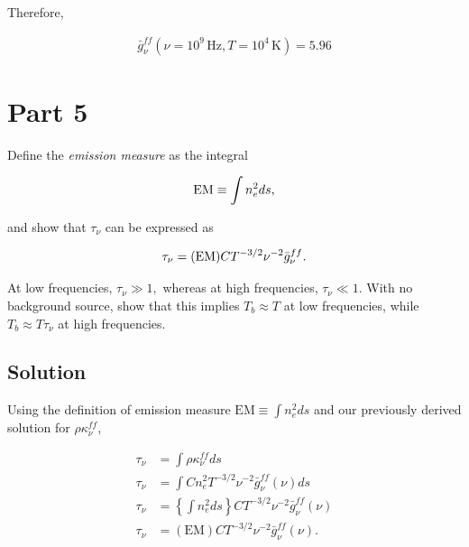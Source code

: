 \documentclass[12pt]{article}
\begin{document}
Therefore,

\begin{align*}
    \boxed{\bar{g}_\nu^{ff}(\nu=10^9\,\mathrm{Hz},T=10^4\,\mathrm{K}) = 5.96}
\end{align*}


\section*{Part 5}

Define the \textit{emission measure} as the integral

\begin{align*}
{\rm EM} \equiv \int n_e^2ds,
\end{align*}

{\noindent}and show that $\tau_\nu$ can be expressed as 

\begin{align} \label{eq:4}
\tau_\nu = ({\rm EM})CT^{-3/2}\nu^{-2}\bar{g}_\nu^{ff}.
\end{align}


{\noindent}At low frequencies, $\tau_\nu \gg 1,$ whereas at high frequencies, $\tau_\nu \ll 1$. With no background source, show that this implies $T_b \approx T$ at low frequencies, while $T_b \approx T\tau_\nu$ at high frequencies.


\subsection*{Solution}

Using the definition of emission measure $\mathrm{EM} \equiv \int n_e^2ds$ and our previously derived solution for $\rho\kappa_\nu^{ff}$,

\begin{equation*}
\begin{split}
    \tau_\nu &= \int \rho\kappa_\nu^{ff}ds \\
    \tau_\nu &= \int C n_e^2 T^{-3/2} \nu^{-2}\bar{g}_\nu^{ff}(\nu) ds \\
    \tau_\nu &= \left\{ \int n_e^2ds\right\} C T^{-3/2} \nu^{-2}\bar{g}_\nu^{ff}(\nu) \\
    \tau_\nu &= \mathrm{(EM)} C T^{-3/2} \nu^{-2}\bar{g}_\nu^{ff}(\nu).
\end{split}
\end{equation*}
\end{document}
